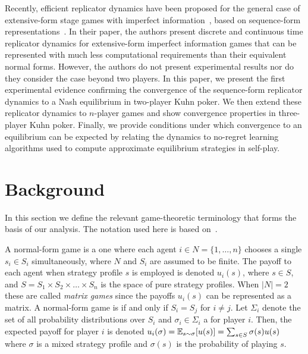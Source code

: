 \documentclass{aamas2013}
\begin{document}
Recently, efficient replicator dynamics have been proposed for the general case of extensive-form stage games with 
imperfect information~\cite{Gatti13Efficient}, based on sequence-form representations~\cite{SequenceFormLPs}. 
In their paper, the authors present discrete and continuous time replicator dynamics
for extensive-form imperfect information games that can be represented with much less computational requirements than their equivalent
normal forms. However, the authors do not present experimental results nor do they consider the case beyond two players. 
In this paper, we present the first experimental evidence confirming the convergence of the sequence-form replicator dynamics  
to a Nash equilibrium in two-player Kuhn poker. We then extend these replicator dynamics to $n$-player games and show convergence 
properties in three-player Kuhn poker. Finally, we provide conditions under which convergence to an equilibrium can be expected by relating the 
dynamics to no-regret learning algorithms used to compute approximate equilibrium strategies in self-play. 



\section{Background}


In this section we define the relevant game-theoretic terminology that forms the basis
of our analysis. The notation used here is based on~\cite{OsbRub94}. 

A normal-form game is a one where each agent $i \in N = \{ 1, \ldots, n \}$ 
chooses a single  $s_i \in S_i$ simultaneously, where $N$ and $S_i$ are assumed to 
be finite. The payoff to each agent when strategy profile $s$ is employed is denoted $u_i(s)$, where $s \in S$, and 
$S = S_1 \times S_2 \times \ldots \times S_n$ is the space of pure strategy profiles. 
When $|N| = 2$ these are called {\it matrix games} since the payoffs $u_i(s)$ can be represented as a matrix. 
A normal-form game is  if and only if $S_i = S_j$ for $i \not= j$. Let $\Sigma_i$ denote the set of 
all probability distributions over $S_i$ and $\sigma_i \in \Sigma_i$ a  for player $i$. 
Then, the expected payoff for player $i$ is denoted $u_i(\sigma) = \mathbb{E}_{s \sim \sigma}[u(s)] = \sum_{s \in S} \sigma(s) u(s)$
where $\sigma$ is a mixed strategy profile and $\sigma(s)$ is the probability of playing $s$. 
\end{document}
